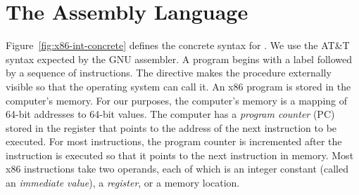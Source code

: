\documentclass[7x10]{TimesAPriori_MIT}%
\numberwithin{theorem}{chapter}
\numberwithin{definition}{chapter}
\numberwithin{equation}{chapter}
\begin{document}
\section{The \LangXInt{} Assembly Language}
\label{sec:x86}

Figure~\ref{fig:x86-int-concrete} defines the concrete syntax for
\LangXInt{}.  We use the AT\&T syntax expected by the GNU
assembler.
%
A program begins with a  label followed by a sequence of
instructions. The  directive makes the  procedure
externally visible so that the operating system can call it.
%
An x86 program is stored in the computer's memory.  For our purposes,
the computer's memory is a mapping of 64-bit addresses to 64-bit
values.  The computer has a \emph{program counter}
(PC) stored in the
 register that points to the address of the next instruction
to be executed.  For most instructions, the program counter is
incremented after the instruction is executed so that it points to the
next instruction in memory. Most x86 instructions take two operands,
each of which is an integer constant (called an \emph{immediate
  value}), a
\emph{register}, or a memory location.

\newcommand{\allregisters}{\key{rsp} \MID \key{rbp} \MID \key{rax} \MID \key{rbx} \MID \key{rcx}
              \MID \key{rdx} \MID \key{rsi} \MID \key{rdi} \MID \\
              && \key{r8} \MID \key{r9} \MID \key{r10}
              \MID \key{r11} \MID \key{r12} \MID \key{r13}
              \MID \key{r14} \MID \key{r15}}

\newcommand{\GrammarXIntRacket}{
\begin{array}{rcl}
\Reg &::=& \allregisters{} \\
\Dst &::=&  \key{\%}\Reg \MID \Int\key{(}\key{\%}\Reg\key{)}\\
\Src &::=&  \key{\$}\Int \MID \Dst \\
\Instr &::=& \key{addq} \; \Src\key{,} \Dst \MID
      \key{subq} \; \Src\key{,} \Dst \MID
      \key{negq} \; \Dst \MID \key{movq} \; \Src\key{,} \Dst \MID \\
  &&  \key{pushq}\;\Dst \MID \key{popq}\;\Dst \MID 
      \key{callq} \; \mathit{label} \MID
      \key{retq} \MID
      \key{jmp}\,\itm{label} \MID \\
  && \itm{label}\key{:}\; \Instr 
\end{array}
}
\end{document}
